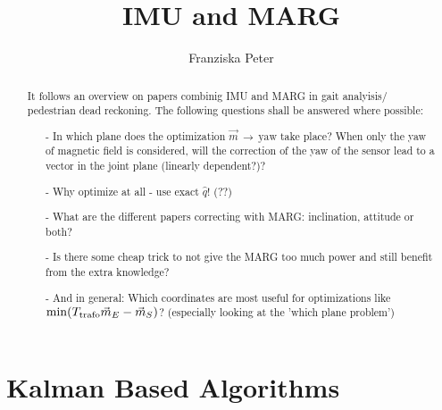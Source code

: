 \documentclass[a4paper,10pt]{article}
\title{IMU and MARG}
\author{Franziska Peter}
\begin{document}
\maketitle

\begin{abstract}
It follows an overview on papers combinig IMU and MARG in gait analyisis/ pedestrian dead reckoning. The following questions shall be answered where possible:
\begin{itemize}
 \item[-] In which plane does the optimization $\vec m\, \rightarrow \,\mathrm{yaw}$ take place? When only the yaw of magnetic field is considered, will the correction of the yaw of the sensor lead to a vector in the joint plane (linearly dependent?)? 
 
\item[-] Why optimize at all - use exact $\hat q$! (??)

\item[-] What are the different papers correcting with MARG: inclination, attitude or both?

\item[-] Is there some cheap trick to not give the MARG too much power and still benefit from the extra knowledge? 

\item[-] And in general: Which coordinates are most useful for optimizations like $\min (T_{\mathrm{\tiny trafo}}\vec m_{E}-\vec m_{S})$? (especially looking at the 'which plane problem')
\end{itemize}
\end{abstract}

\section{Kalman Based Algorithms}
\end{document}
